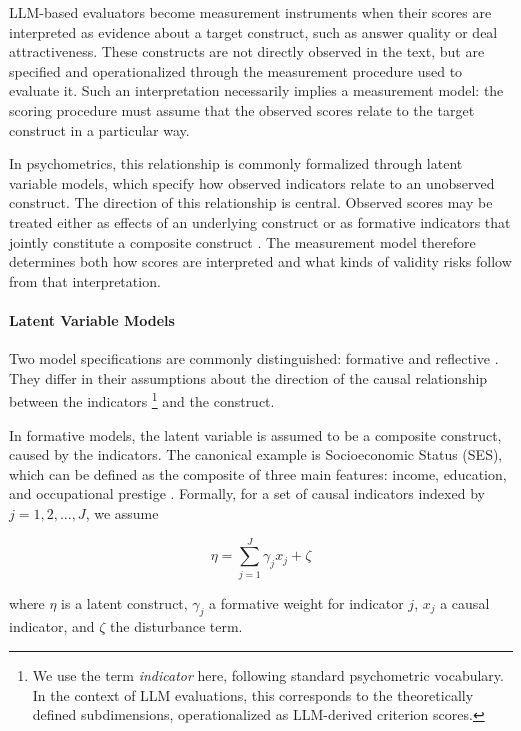LLM-based evaluators become measurement instruments when their scores are interpreted as evidence about a target construct, such as answer quality or deal attractiveness. These constructs are not directly observed in the text, but are specified and operationalized through the measurement procedure used to evaluate it. Such an interpretation necessarily implies a measurement model: the scoring procedure must assume that the observed scores relate to the target construct in a particular way.

In psychometrics, this relationship is commonly formalized through latent variable models, which specify how observed indicators relate to an unobserved construct. The direction of this relationship is central. Observed scores may be treated either as effects of an underlying construct or as formative indicators that jointly constitute a composite construct \citep{bollen1991conventional, edwardsNatureDirectionRelationships2000}. The measurement model therefore determines both how scores are interpreted and what kinds of validity risks follow from that interpretation.


\paragraph{Latent Variable Models}

Two model specifications are commonly distinguished: formative and reflective \citep{bollen1991conventional}. They differ in their assumptions about the direction of the causal relationship between the indicators \footnote{We use the term \textit{indicator} here, following standard psychometric vocabulary. In the context of LLM evaluations, this corresponds to the theoretically defined subdimensions, operationalized as LLM-derived criterion scores.} and the construct.

In formative models, the latent variable is assumed to be a composite construct, caused by the indicators. The canonical example is Socioeconomic Status (SES), which can be defined as the composite of three main features: income, education, and occupational prestige \citep{mcquitty2013structural}. Formally, for a set of causal indicators indexed by $j = 1,2, \dots ,J$, we assume

\begin{equation}\label{eq:formative_model}
    \eta = \sum_{j=1}^{J} \gamma_j x_{j} + \zeta
\end{equation}

where $\eta$ is a latent construct, $\gamma_j$ a formative weight for indicator $j$, $x_{j}$ a causal indicator, and $\zeta$ the disturbance term. 

